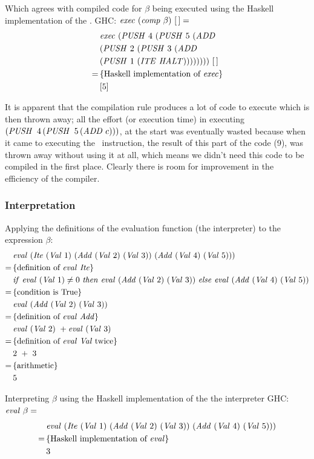 \documentclass {article}
\begin{document}
Which agrees with compiled code for $\beta$ being executed
using the Haskell implementation of the \vm.
GHC: \( \mathit{exec\ } (\mathit{comp\ } \beta)\ [\, ] =\) 
\begin{align*}
&\mathit{exec\ } (\mathit{PUSH\ } 4\ (\mathit{PUSH\ } 5\ (\mathit{ADD\ } \\
			&(\mathit{PUSH\ } 2\ (\mathit{PUSH\ } 3\ (\mathit{ADD\ } \\
			&(\mathit{PUSH\ } 1\ (\mathit{ITE\ } \mathit{HALT}))))))))\ [\, ] \\
=\, & \{ \mbox{Haskell implementation of \textit{exec}} \} \\
&[5] 
\end{align*}

It is apparent that the compilation rule produces a lot
of code to execute which is then thrown away;
all the effort (or execution time) in executing 
\( (\mathit{PUSH\ }\, 4\, (\mathit{PUSH\ }\, 5\, (\mathit{ADD\ } c))) \), 
at the start was eventually wasted because when it came
to executing the \ITEt\ instruction, 
the result of this part of the code (9),
 was thrown away without using it at all,
which means we didn't need this code to be compiled
in the first place. 
Clearly there is room for improvement in the
efficiency of the compiler.

\subsubsection{Interpretation}

Applying the definitions of the evaluation function (the interpreter) to the expression $\beta$:
\begin{align*}
	&\evalf  (\Ite (\Val 1)\ 
	(\Add (\Val 2)\ (\Val 3))\ (\Add (\Val 4)\ (\Val 5))) \\
	=\, & \{ \mbox{definition of \eval\ \ite} \} \\
	&\ifff \evalf (\Val 1) \not= 0\ 
		\tthen \evalf (\Add (\Val 2)\ (\Val 3))\
		 \eelse  \evalf (\Add (\Val 4)\ (\Val 5))  \\
	=\, & \{ \mbox{condition is True} \} \\
	&\evalf (\Add (\Val 2)\ (\Val 3)) \\
	=\, & \{ \mbox{definition of \eval\ \add} \} \\
	&\evalf (\Val 2)\ + \evalf (\Val 3) \\
	=\, & \{ \mbox{definition of \eval\ \val\ twice} \} \\
	&2\ +\ 3 \\
	=\, & \{ \mbox{arithmetic} \} \\
	&5
\end{align*}

Interpreting $\beta$ 
using the Haskell implementation of the the interpreter
GHC: \( \mathit{eval\ } \beta = \)
\begin{align*}
&\evalf (\Ite (\Val 1)\ 
	(\Add (\Val 2)\ (\Val 3))\ (\Add (\Val 4)\ (\Val 5))) \\
=\, & \{ \mbox{Haskell implementation of \eval} \} \\
&3
\end{align*}
\end{document}

